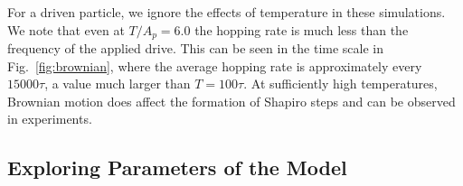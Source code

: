 \documentclass[twocolumn,preprintnumbers,amsmath,amssymb,aps,prx]{revtex4}
\begin{document}

  For a driven particle,
  we ignore 
  the effects of temperature 
  in these simulations.  
  We note that even at $T/A_p = 6.0$ 
  the hopping rate
  is much less than the
  frequency of the applied drive.
  This can be seen in the time scale in Fig.~\ref{fig:brownian},
  where the average hopping rate is approximately
  every $15000\tau$,
  a value much larger than $T = 100\tau$.
  At sufficiently high temperatures,
  Brownian motion does affect 
  the formation of Shapiro steps
  and can be observed in experiments.

  \subsection{Exploring Parameters of the Model}
  \label{ex:parameters}
\end{document}
